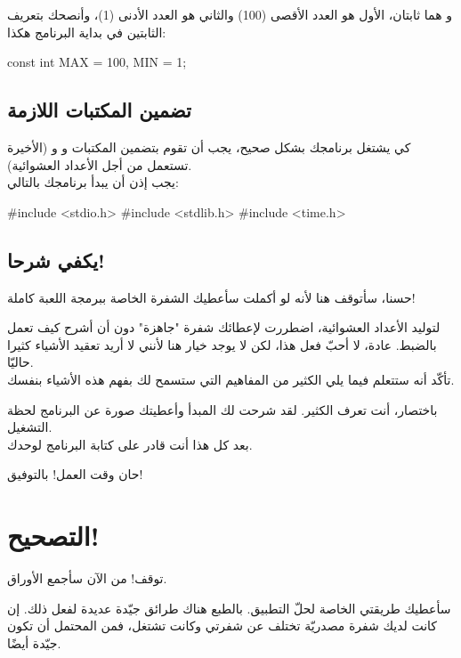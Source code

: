 و 
هما ثابتان، الأول هو العدد الأقصى (100) والثاني هو العدد الأدنى (1)، وأنصحك بتعريف الثابتين في بداية البرنامج هكذا:

\begin{Csource}
const int MAX = 100, MIN = 1;
\end{Csource}

\subsection{تضمين المكتبات اللازمة}

كي يشتغل برنامجك بشكل صحيح، يجب أن تقوم بتضمين المكتبات 
و 
و 
(الأخيرة تستعمل من أجل الأعداد العشوائية).\\
يجب إذن أن يبدأ برنامجك بالتالي:

\begin{Csource}
#include <stdio.h>
#include <stdlib.h>
#include <time.h>
\end{Csource}

\subsection{يكفي شرحا!}

حسنا، سأتوقف هنا لأنه لو أكملت سأعطيك الشفرة الخاصة ببرمجة اللعبة كاملة!

\begin{information}
لتوليد الأعداد العشوائية، اضطررت لإعطائك شفرة "جاهزة" دون أن أشرح كيف تعمل بالضبط. عادة، لا أحبّ فعل هذا، لكن لا يوجد خيار هنا لأنني لا أريد تعقيد الأشياء كثيرا حاليّا.\\
تأكّد أنه ستتعلم فيما يلي الكثير من المفاهيم التي ستسمح لك بفهم هذه الأشياء بنفسك.
\end{information}

باختصار، أنت تعرف الكثير. لقد شرحت لك المبدأ وأعطيتك صورة عن البرنامج لحظة التشغيل.\\
بعد كل هذا أنت قادر على كتابة البرنامج لوحدك.

حان وقت العمل! بالتوفيق!

\section{التصحيح!}
توقف! من الآن سأجمع الأوراق.

سأعطيك طريقتي الخاصة لحلّ التطبيق. بالطبع هناك طرائق جيّدة عديدة لفعل ذلك. إن كانت لديك شفرة مصدريّة تختلف عن شفرتي وكانت تشتغل، فمن المحتمل أن تكون جيّدة أيضًا.

